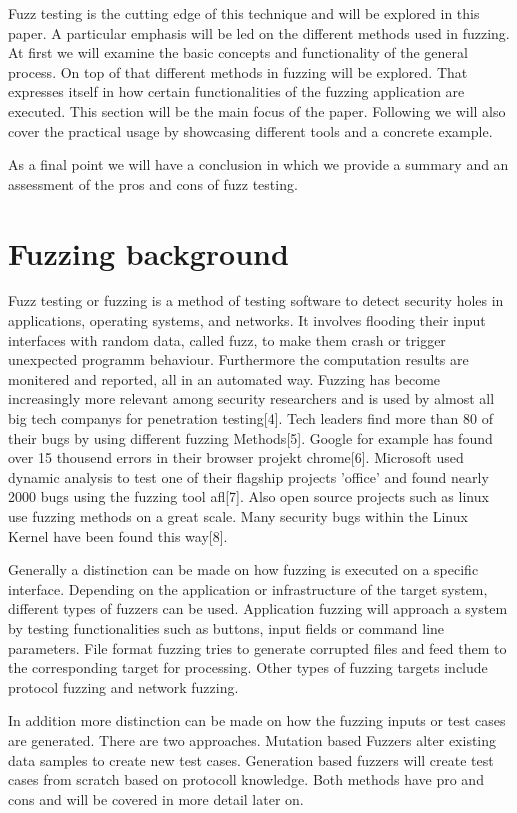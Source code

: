 \documentclass[journal=tosc,final]{iacrtrans}
\begin{document}
Fuzz testing is the cutting edge of this technique and will be explored in this paper. A particular emphasis will be led on the different methods used in fuzzing. 
At first we will examine the basic concepts and functionality of the general process. On top of that different methods in fuzzing will be explored. That expresses itself in how certain functionalities of the fuzzing application are executed. This section will be the main focus of the paper. Following we will also cover the practical usage by showcasing different tools and a concrete example. 

As a final point we will have a conclusion in which we provide a summary and an assessment of the pros and cons of fuzz testing. 
\newpage
\section{Fuzzing background}
Fuzz testing or fuzzing is a method of testing software to detect security holes in applications, operating systems, and networks. It involves flooding their input interfaces with random data, called fuzz, to make them crash or trigger unexpected programm behaviour. Furthermore the computation results are monitered and reported, all in an automated way. Fuzzing has become increasingly more relevant among security researchers and is used by almost all big tech companys for penetration testing[4]. Tech leaders find more than 80 of their bugs by using different fuzzing Methods[5]. Google for example  has found over 15 thousend errors in their browser projekt chrome[6]. Microsoft used dynamic analysis to test one of their flagship projects 'office' and found nearly 2000 bugs using the fuzzing tool afl[7]. Also open source projects such as linux use fuzzing methods on a great scale. Many security bugs within the Linux Kernel have been found this way[8].

Generally a distinction can be made on how fuzzing is executed on a specific interface. Depending on the application or infrastructure of the target system, different types of fuzzers can be used. Application fuzzing will approach a system by testing functionalities such as buttons, input fields or command line parameters. File format fuzzing tries to generate corrupted files and feed them to the corresponding target for processing. Other types of fuzzing targets include protocol fuzzing and network fuzzing.

In addition more distinction can be made on how the fuzzing inputs or test cases are generated. There are two approaches. Mutation based Fuzzers alter existing data samples to create new test cases.
Generation based fuzzers will create test cases from scratch based on protocoll knowledge. 
Both methods have pro and cons and will be covered in more detail later on.
\end{document}
